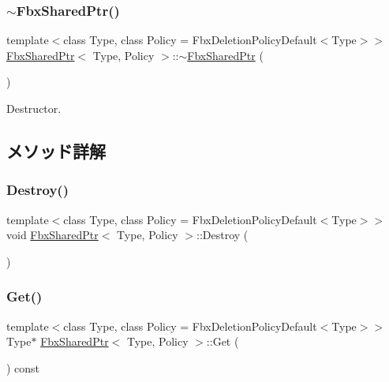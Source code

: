 \mbox{\label{class_fbx_shared_ptr_a15061ed1e4085e6a053c66b88c509ae6}} 
\subsubsection{\texorpdfstring{$\sim$\+Fbx\+Shared\+Ptr()}{~FbxSharedPtr()}}
{\footnotesize\ttfamily template$<$class Type, class Policy = Fbx\+Deletion\+Policy\+Default$<$\+Type$>$$>$ \\
\hyperlink{class_fbx_shared_ptr}{Fbx\+Shared\+Ptr}$<$ Type, Policy $>$\+::$\sim$\hyperlink{class_fbx_shared_ptr}{Fbx\+Shared\+Ptr} (\begin{DoxyParamCaption}{ }\end{DoxyParamCaption})}



Destructor. 



\subsection{メソッド詳解}
\mbox{\label{class_fbx_shared_ptr_a706fe3ede6f8a43589348169f4803c75}} 
\subsubsection{\texorpdfstring{Destroy()}{Destroy()}}
{\footnotesize\ttfamily template$<$class Type, class Policy = Fbx\+Deletion\+Policy\+Default$<$\+Type$>$$>$ \\
void \hyperlink{class_fbx_shared_ptr}{Fbx\+Shared\+Ptr}$<$ Type, Policy $>$\+::Destroy (\begin{DoxyParamCaption}{ }\end{DoxyParamCaption})}

\mbox{\label{class_fbx_shared_ptr_a3bc4c8f7e69da6a3f53157a895ee345e}} 
\subsubsection{\texorpdfstring{Get()}{Get()}}
{\footnotesize\ttfamily template$<$class Type, class Policy = Fbx\+Deletion\+Policy\+Default$<$\+Type$>$$>$ \\
Type$\ast$ \hyperlink{class_fbx_shared_ptr}{Fbx\+Shared\+Ptr}$<$ Type, Policy $>$\+::Get (\begin{DoxyParamCaption}{ }\end{DoxyParamCaption}) const}



